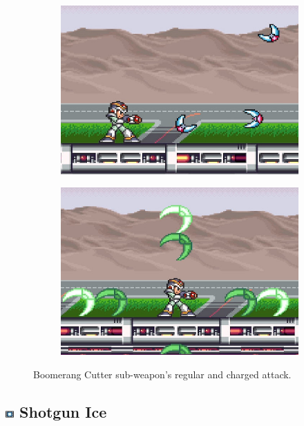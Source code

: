 \begin{figure}[htp]
	\centering
	\begin{subfigure}{0.3\linewidth}
		\includegraphics[width=\linewidth]{figures/X1/weapons/Boomerang_1.jpg}
	\end{subfigure}
	\begin{subfigure}{0.3\linewidth}
		\includegraphics[width=\linewidth]{figures/X1/weapons/Boomerang_2.jpg}
	\end{subfigure}
	\caption{Boomerang Cutter sub-weapon's regular and charged attack.}
\end{figure}

\subsection{\includegraphics[width=12px, height=10px]{figures/X1/weapons/S_ice.jpg} Shotgun Ice}\label{Shotgun_ice}

